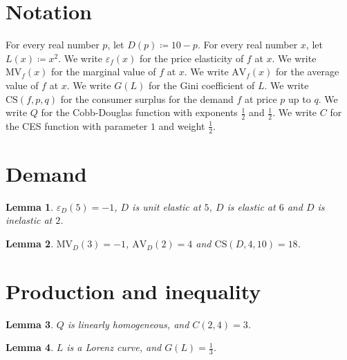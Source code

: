 \documentclass{article}
\newtheorem{lemma}{Lemma}
\begin{document}
\section{Notation}

For every real number $p$, let $D(p)\coloneqq 10-p$.
For every real number $x$, let $L(x)\coloneqq x^2$.
We write $\varepsilon_f(x)$ for the price elasticity of $f$ at $x$.
We write $\mathrm{MV}_f(x)$ for the marginal value of $f$ at $x$.
We write $\mathrm{AV}_f(x)$ for the average value of $f$ at $x$.
We write $G(L)$ for the Gini coefficient of $L$.
We write $\mathrm{CS}(f,p,q)$ for the consumer surplus for the demand $f$ at price $p$ up to $q$.
We write $Q$ for the Cobb-Douglas function with exponents $\frac12$ and $\frac12$.
We write $C$ for the CES function with parameter $1$ and weight $\frac12$.

\section{Demand}

\begin{lemma}\label{elasticity}
$\varepsilon_D(5)=-1$, $D$ is unit elastic at $5$, $D$ is elastic at $6$ and $D$ is inelastic at $2$.
\end{lemma}

\begin{lemma}\label{marginal}
$\mathrm{MV}_D(3)=-1$, $\mathrm{AV}_D(2)=4$ and $\mathrm{CS}(D,4,10)=18$.
\end{lemma}

\section{Production and inequality}

\begin{lemma}\label{production}
$Q$ is linearly homogeneous, and $C(2,4)=3$.
\end{lemma}

\begin{lemma}\label{lorenz}
$L$ is a Lorenz curve, and $G(L)=\frac13$.
\end{lemma}
\end{document}
